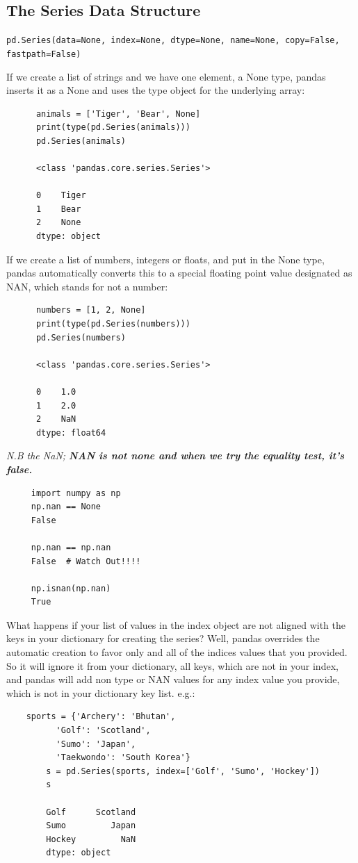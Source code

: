 \documentclass[11pt]{article}
\begin{document}
    \subsection{The Series Data Structure}
    
    \smallskip\smallskip\noindent
    {\tt pd.Series(data=None, index=None, dtype=None, name=None, copy=False, fastpath=False)}

    \smallskip\smallskip\noindent
    If we create a list of strings and we have one element, a None
    type, pandas inserts it as a None and uses the type object for the
    underlying array:
    \begin{lstlisting}
      animals = ['Tiger', 'Bear', None]
      print(type(pd.Series(animals)))
      pd.Series(animals)
      
      <class 'pandas.core.series.Series'>

      0    Tiger
      1    Bear
      2    None
      dtype: object
    \end{lstlisting}
    
    \smallskip\smallskip\noindent
    If we create a list of numbers, integers or floats, and put in the
    None type, pandas automatically converts this to a special floating
    point value designated as NAN, which stands for not a number:
    \begin{lstlisting}
      numbers = [1, 2, None]
      print(type(pd.Series(numbers)))
      pd.Series(numbers)

      <class 'pandas.core.series.Series'>

      0    1.0
      1    2.0
      2    NaN
      dtype: float64
    \end{lstlisting}
    {\it N.B the NaN; {\bf NAN is not none and when we try the equality test, it's false.}}

    \begin{lstlisting}
     import numpy as np
     np.nan == None
     False

     np.nan == np.nan
     False  # Watch Out!!!!

     np.isnan(np.nan)
     True
    \end{lstlisting}

    What happens if your list of values in the index object are not aligned with the keys in your dictionary for creating the series? Well, pandas overrides the automatic creation to favor only and all of the indices values that you provided. So it will ignore it from your dictionary, all keys, which are not in your index, and pandas will add non type or NAN values for any index value you provide, which is not in your dictionary key list. e.g.:
    \begin{lstlisting}
    sports = {'Archery': 'Bhutan',
          'Golf': 'Scotland',
          'Sumo': 'Japan',
          'Taekwondo': 'South Korea'}
        s = pd.Series(sports, index=['Golf', 'Sumo', 'Hockey'])
        s
        
        Golf      Scotland
        Sumo         Japan
        Hockey         NaN
        dtype: object
    \end{lstlisting}
\end{document}
